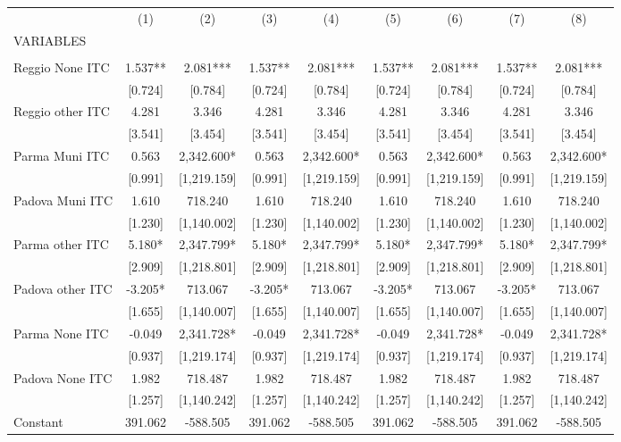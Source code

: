 \begin{tabular}{lcccccccc} \hline
 & (1) & (2) & (3) & (4) & (5) & (6) & (7) & (8) \\
VARIABLES &  &  &  &  &  &  &  &  \\ \hline
 &  &  &  &  &  &  &  &  \\
Reggio None ITC & 1.537** & 2.081*** & 1.537** & 2.081*** & 1.537** & 2.081*** & 1.537** & 2.081*** \\
 & [0.724] & [0.784] & [0.724] & [0.784] & [0.724] & [0.784] & [0.724] & [0.784] \\
Reggio other ITC & 4.281 & 3.346 & 4.281 & 3.346 & 4.281 & 3.346 & 4.281 & 3.346 \\
 & [3.541] & [3.454] & [3.541] & [3.454] & [3.541] & [3.454] & [3.541] & [3.454] \\
Parma Muni ITC & 0.563 & 2,342.600* & 0.563 & 2,342.600* & 0.563 & 2,342.600* & 0.563 & 2,342.600* \\
 & [0.991] & [1,219.159] & [0.991] & [1,219.159] & [0.991] & [1,219.159] & [0.991] & [1,219.159] \\
Padova Muni ITC & 1.610 & 718.240 & 1.610 & 718.240 & 1.610 & 718.240 & 1.610 & 718.240 \\
 & [1.230] & [1,140.002] & [1.230] & [1,140.002] & [1.230] & [1,140.002] & [1.230] & [1,140.002] \\
Parma other ITC & 5.180* & 2,347.799* & 5.180* & 2,347.799* & 5.180* & 2,347.799* & 5.180* & 2,347.799* \\
 & [2.909] & [1,218.801] & [2.909] & [1,218.801] & [2.909] & [1,218.801] & [2.909] & [1,218.801] \\
Padova other ITC & -3.205* & 713.067 & -3.205* & 713.067 & -3.205* & 713.067 & -3.205* & 713.067 \\
 & [1.655] & [1,140.007] & [1.655] & [1,140.007] & [1.655] & [1,140.007] & [1.655] & [1,140.007] \\
Parma None ITC & -0.049 & 2,341.728* & -0.049 & 2,341.728* & -0.049 & 2,341.728* & -0.049 & 2,341.728* \\
 & [0.937] & [1,219.174] & [0.937] & [1,219.174] & [0.937] & [1,219.174] & [0.937] & [1,219.174] \\
Padova None ITC & 1.982 & 718.487 & 1.982 & 718.487 & 1.982 & 718.487 & 1.982 & 718.487 \\
 & [1.257] & [1,140.242] & [1.257] & [1,140.242] & [1.257] & [1,140.242] & [1.257] & [1,140.242] \\
Constant & 391.062 & -588.505 & 391.062 & -588.505 & 391.062 & -588.505 & 391.062 & -588.505 \\

\end{tabular}
